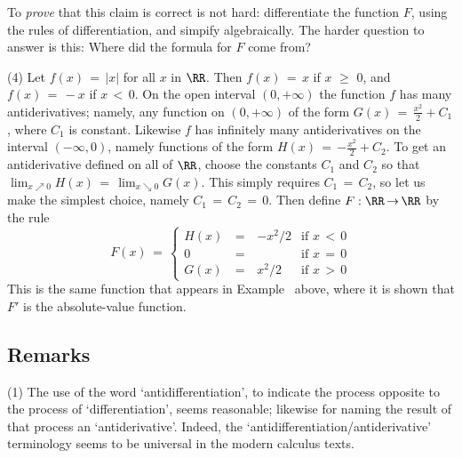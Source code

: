 {        To {\em prove} that this claim is correct is not hard: differentiate the function $F$, using the rules of differentiation, and simpify algebraically.
    The harder question to answer is this: Where did the formula for $F$ come from?

\V

        (4) Let $f(x) \,=\, |x|$ for all $x$ in ${\RR}$. Then $f(x) \,=\, x$ if $x\,\,{\geq}\,\,0$, and $f(x) \,=\, -x$ if $x\,<\,0$.
    On the open interval $(0,+{\infty})$ the function $f$ has many antiderivatives;
    namely, any function on $(0,+{\infty})$ of the form $G(x) \,=\, {\displaystyle \frac{x^{2}}{2}+C_{1}}$, where $C_{1}$ is constant.
    Likewise $f$ has infinitely many antiderivatives on the interval $(-{\infty},0)$,
    namely functions of the form $H(x) \,=\, {\displaystyle -\frac{x^{2}}{2}+C_{2}}$.
    To get an antiderivative defined on all of ${\RR}$, choose the constants $C_{1}$ and $C_{2}$ so that $\lim_{x{\nearrow}0} H(x) \,=\, \lim_{x{\searrow}0} G(x)$.
    This simply requires $C_{1} \,=\, C_{2}$, so let us make the simplest choice, namely $C_{1} \,=\, C_{2} \,=\, 0$.
    Then define $F:{\RR} \,{\rightarrow}\, {\RR}$ by the rule
        \begin{displaymath}
        F(x) \,=\, \left\{
        \begin{array}{ccrl}
        H(x) & \,=\, & -x^{2}/2 & \mbox{if $x\,<\,0$} \\
          0  & \,=\, &          & \mbox{if $x\,=\,0$} \\
        G(x) & \,=\, &  x^{2}/2 & \mbox{if $x\,>\,0$}
        \end{array}
                        \right.
        \end{displaymath}
    This is the same function that appears in Example~ above, where it is shown that $F'$ is the absolute-value function.

\VV



             \subsection{\small{\bf Remarks}}
            \label{RemrkE45.70}
\V

\hspace*{\parindent}(1) The use of the word `antidifferentiation', to indicate the process opposite to the process of `differentiation', seems reasonable;
    likewise for naming the result of that process an `antiderivative'. Indeed, the `antidifferentiation/antiderivative' terminology
    seems to be universal in the modern calculus texts.

}
